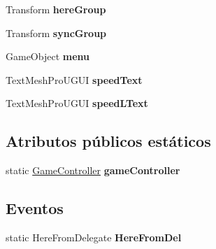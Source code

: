 \begin{DoxyCompactItemize}
\mbox{\label{class_game_controller_adc5d9c82337016042d0a4b7a431b8a0e}} 
Transform {\bfseries here\+Group}
\item 
\mbox{\label{class_game_controller_aef6447cf8e9a9e5945a45e0a0d4cbeea}} 
Transform {\bfseries sync\+Group}
\item 
\mbox{\label{class_game_controller_af4c293b5d621fe28f1e6b72f9efa293f}} 
Game\+Object {\bfseries menu}
\item 
\mbox{\label{class_game_controller_ae2a547ae9f7294b4c3d7064ff037b7d1}} 
Text\+Mesh\+Pro\+U\+G\+UI {\bfseries speed\+Text}
\item 
\mbox{\label{class_game_controller_a80a5ddb548350ff8522690213155ffc7}} 
Text\+Mesh\+Pro\+U\+G\+UI {\bfseries speed\+L\+Text}
\end{DoxyCompactItemize}
\subsection*{Atributos públicos estáticos}
\begin{DoxyCompactItemize}
\item 
\mbox{\label{class_game_controller_a46ccbbf4e13ee78f28da6b0ed2595cf3}} 
static \mbox{\hyperlink{class_game_controller}{Game\+Controller}} {\bfseries game\+Controller}
\end{DoxyCompactItemize}
\subsection*{Eventos}
\begin{DoxyCompactItemize}
\item 
\mbox{\label{class_game_controller_acb69ab50fb463c78d7d47e94edf85a9e}} 
static Here\+From\+Delegate {\bfseries Here\+From\+Del}
\end{DoxyCompactItemize}
